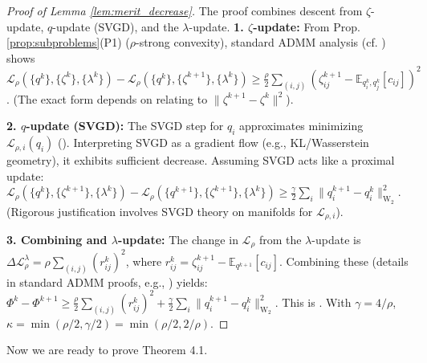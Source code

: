 \begin{proof}[Proof of Lemma \ref{lem:merit_decrease}]
The proof combines descent from $\zeta$-update, $q$-update (SVGD), and the $\lambda$-update.
\textbf{1. $\zeta$-update:} From Prop. \ref{prop:subproblems}(P1) ($\rho$-strong convexity), standard ADMM analysis (cf. \cite{Boyd2011}) shows ${\mathcal{L}}_{\rho}(\{q^k\}, \{\zeta^k\}, \{\lambda^k\}) - {\mathcal{L}}_{\rho}(\{q^k\}, \{\zeta^{k+1}\}, \{\lambda^k\}) \ge \frac{\rho}{2} \sum_{(i,j)} (\zeta_{ij}^{k+1} - \mathbb{E}_{q_i^k, q_j^k}[c_{ij}])^2$. (The exact form depends on relating to $\|\zeta^{k+1}-\zeta^k\|^2$).

\textbf{2. $q$-update (SVGD):} The SVGD step for $q_i$ approximates minimizing ${\mathcal{L}}_{\rho, i}(q_i)$ (). Interpreting SVGD as a gradient flow (e.g., KL/Wasserstein geometry), it exhibits sufficient decrease. Assuming SVGD acts like a proximal update:
${\mathcal{L}}_{\rho}(\{q^k\}, \{\zeta^{k+1}\}, \{\lambda^k\}) - {\mathcal{L}}_{\rho}(\{q^{k+1}\}, \{\zeta^{k+1}\}, \{\lambda^k\}) \ge \frac{\gamma}{2} \sum_{i} \|q_i^{k+1} - q_i^k\|^2_{\text{W}_2}$.
(Rigorous justification involves SVGD theory on manifolds for ${\mathcal{L}}_{\rho, i}$).

\textbf{3. Combining and $\lambda$-update:} The change in ${\mathcal{L}}_{\rho}$ from the $\lambda$-update is $\Delta {\mathcal{L}}_{\rho}^{\lambda} = \rho \sum_{(i,j)} (r_{ij}^k)^2$, where $r_{ij}^k = \zeta_{ij}^{k+1} - \mathbb{E}_{q^{k+1}}[c_{ij}]$.
Combining these (details in standard ADMM proofs, e.g., \cite{Boyd2011}) yields:
$\Phi^k - \Phi^{k+1} \ge \frac{\rho}{2} \sum_{(i,j)} (r_{ij}^k)^2 + \frac{\gamma}{2} \sum_{i} \|q_i^{k+1} - q_i^k\|^2_{\text{W}_2}$.
This is . With $\gamma = 4/\rho$, $\kappa = \min(\rho/2, \gamma/2) = \min(\rho/2, 2/\rho)$.
\end{proof}
Now we are ready to prove Theorem  4.1.
